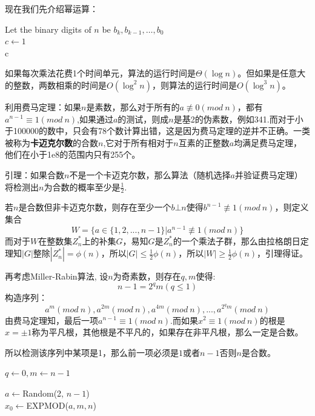 \documentclass[./../main.tex]{subfiles} %
\begin{document}
现在我们先介绍幂运算：
\begin{algorithm}[h]
    \SetAlgoLined
    Let the binary digits of $n$ be $b_k, b_{k-1}, \dots, b_0$\\
    $c\leftarrow 1$\\
    \Return c
    \caption{EXP}
\end{algorithm}
如果每次乘法花费1个时间单元，算法的运行时间是$\Theta(\log n)$。但如果是任意大的整数，两数相乘的时间是$O(\log^2n)$，则算法的运行时间是$O(\log^3 n)$。

利用费马定理：如果$n$是素数，那么对于所有的$a\not\equiv0(mod~n)$，都有$a^{n-1}\equiv1(mod~n)$,如果通过$a$的测试，则成$n$是基2的伪素数，例如341.而对于小于100000的数中，只会有78个数计算出错，这是因为费马定理的逆并不正确。一类被称为\textbf{卡迈克尔数}的合数$n$,它对于所有相对于$n$互素的正整数$a$均满足费马定理，他们在小于1e8的范围内只有255个。

引理：如果合数$n$不是一个卡迈克尔数，那么算法（随机选择$a$并验证费马定理）将检测出$n$为合数的概率至少是$\frac{1}{2}$.

若$n$是合数但非卡迈克尔数，则存在至少一个$b\bot n$使得$b^{n-1}\not\equiv1(mod~n)$，则定义集合
$$
W=\{a\in\{1,2,...,n-1\}|a^{n-1}\not\equiv1(mod~n)\}
$$
而对于$W$在整数集$Z_n^*$上的补集$G$，易知$G$是$Z_n^*$的一个乘法子群，那么由拉格朗日定理知$|G| $整除$ |Z_n^*|=\phi(n)$，所以$|G|\le \frac{1}{2}\phi(n)$，所以$|W|\ge\frac{1}{2}\phi(n)$，引理得证。

再考虑Miller-Rabin算法, 设$n$为奇素数，则存在$q,m$使得:
$$
n-1=2^qm(q\le1)
$$
构造序列：
$$
a^m(mod~n), a^{2m}(mod~n), a^{4m}(mod~n),...,a^{2^qm}(mod~n)
$$
由费马定理知，最后一项$a^{n-1}\equiv 1(mod~n)$.而如果$x^2\equiv1(mod~n)$的根是$x=\pm1$称为平凡根，其他根是不平凡的，如果存在非平凡根，那么一定是合数。

所以检测该序列中某项是1，那么前一项必须是$1$或者$n-1$否则$n$是合数。
\begin{algorithm}[h]
    \SetAlgoLined
    \BlankLine
    $q\leftarrow 0, m \leftarrow n-1$\\

    $a\leftarrow $Random(2, $n-1$)\\
    $x_0\leftarrow$EXPMOD($a, m, n$)
    \caption{单次的Miller-Rabin素数判定算法}
\end{algorithm}
\end{document}
